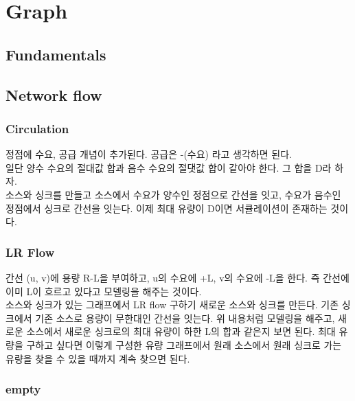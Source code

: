 \chapter{Graph}

\section{Fundamentals}

\section{Network flow}

	\subsection{Circulation}
		정점에 수요, 공급 개념이 추가된다. 공급은 -(수요) 라고 생각하면 된다.\\
		일단 양수 수요의 절대값 합과 음수 수요의 절댓값 합이 같아야 한다. 그 합을 D라 하자.\\
		소스와 싱크를 만들고 소스에서 수요가 양수인 정점으로 간선을 잇고, 수요가 음수인 정점에서 싱크로 간선을 잇는다. 이제 최대 유량이 D이면 서큘레이션이 존재하는 것이다.

	\subsection{LR Flow}
		간선 (u, v)에 용량 R-L을 부여하고, u의 수요에 +L, v의 수요에 -L을 한다. 즉 간선에 이미 L이 흐르고 있다고 모델링을 해주는 것이다.\\
		소스와 싱크가 있는 그래프에서 LR flow 구하기 새로운 소스와 싱크를 만든다. 기존 싱크에서 기존 소스로 용량이 무한대인 간선을 잇는다. 위 내용처럼 모델링을 해주고, 새로운 소스에서 새로운 싱크로의 최대 유량이 하한 L의 합과 같은지 보면 된다. 최대 유량을 구하고 싶다면 이렇게 구성한 유량 그래프에서 원래 소스에서 원래 싱크로 가는 유량을 찾을 수 있을 때까지 계속 찾으면 된다.
	
	\subsection{empty}


